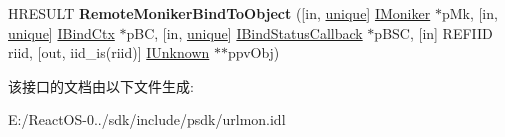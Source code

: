 \begin{DoxyCompactItemize}
\item 
\mbox{\label{interface_i_bind_host_ab0e6a9eed83ef7736359393aad5a8ec6}} 
H\+R\+E\+S\+U\+LT {\bfseries Remote\+Moniker\+Bind\+To\+Object} (\mbox{[}in, \hyperlink{interfaceunique}{unique}\mbox{]} \hyperlink{interface_i_moniker}{I\+Moniker} $\ast$p\+Mk, \mbox{[}in, \hyperlink{interfaceunique}{unique}\mbox{]} \hyperlink{interface_i_bind_ctx}{I\+Bind\+Ctx} $\ast$p\+BC, \mbox{[}in, \hyperlink{interfaceunique}{unique}\mbox{]} \hyperlink{interface_i_bind_status_callback}{I\+Bind\+Status\+Callback} $\ast$p\+B\+SC, \mbox{[}in\mbox{]} R\+E\+F\+I\+ID riid, \mbox{[}out, iid\+\_\+is(riid)\mbox{]} \hyperlink{interface_i_unknown}{I\+Unknown} $\ast$$\ast$ppv\+Obj)
\end{DoxyCompactItemize}


该接口的文档由以下文件生成\+:\begin{DoxyCompactItemize}
\item 
E\+:/\+React\+O\+S-\/0../sdk/include/psdk/urlmon.\+idl\end{DoxyCompactItemize}
